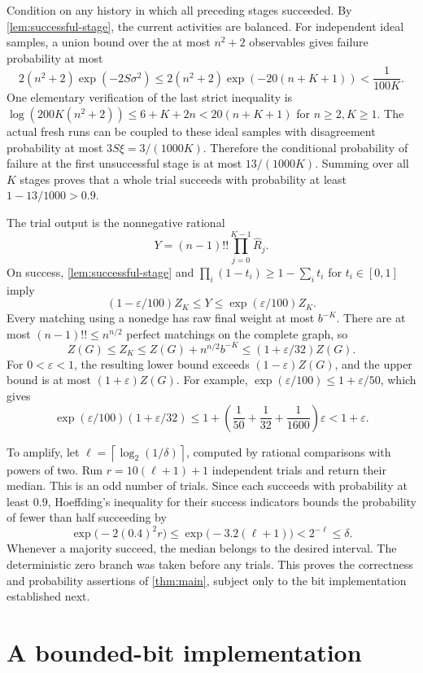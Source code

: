\documentclass[11pt]{article}
\theoremstyle{definition}
\theoremstyle{remark}
\newcommand{\eps}{\varepsilon}
\newcommand{\ceil}[1]{\left\lceil#1\right\rceil}
\numberwithin{equation}{section}
\begin{document}
Condition on any history in which all preceding stages succeeded.
By \cref{lem:successful-stage}, the current activities are balanced.
For independent ideal samples, a union bound over the at most
$n^2+2$ observables gives failure probability at most
\[
 2(n^2+2)\exp(-2S\sigma^2)
 \le2(n^2+2)\exp(-20(n+K+1))<\frac1{100K}.
\]
One elementary verification of the last strict inequality is
$\log(200K(n^2+2))\le6+K+2n<20(n+K+1)$ for $n\ge2,K\ge1$.
The actual fresh runs can be coupled to these ideal samples with
disagreement probability at most $3S\xi=3/(1000K)$.
Therefore the conditional probability of failure at the first
unsuccessful stage is at most $13/(1000K)$. Summing over all $K$
stages proves that a whole trial succeeds with probability at least
$1-13/1000>0.9$.

The trial output is the nonnegative rational
\begin{equation}\label{eq:trial-output}
 Y=(n-1)!!\prod_{j=0}^{K-1}\widehat R_j.
\end{equation}
On success, \cref{lem:successful-stage} and
$\prod_i(1-t_i)\ge1-\sum_i t_i$ for $t_i\in[0,1]$ imply
\[
 (1-\eps/100)Z_K\le Y\le\exp(\eps/100)Z_K.
\]
Every matching using a nonedge has raw final weight at most $b^{-K}$.
There are at most $(n-1)!!\le n^{n/2}$ perfect matchings on the
complete graph, so
\begin{equation}\label{eq:padding-bias}
 Z(G)\le Z_K\le Z(G)+n^{n/2}b^{-K}
             \le(1+\eps/32)Z(G).
\end{equation}
For $0<\eps<1$, the resulting lower bound exceeds
$(1-\eps)Z(G)$, and the upper bound is at most $(1+\eps)Z(G)$.
For example, $\exp(\eps/100)\le1+\eps/50$, which gives
\[
 \exp(\eps/100)(1+\eps/32)
 \le1+\left(\frac1{50}+\frac1{32}+\frac1{1600}\right)\eps
 <1+\eps.
\]

To amplify, let $\ell=\ceil{\log_2(1/\delta)}$, computed by rational
comparisons with powers of two. Run
$r=10(\ell+1)+1$ independent trials and return their median.
This is an odd number of trials. Since each succeeds with probability
at least $0.9$, Hoeffding's inequality for their success indicators
bounds the probability of fewer than half succeeding by
\[
 \exp\bigl(-2(0.4)^2r\bigr)
 \le\exp\bigl(-3.2(\ell+1)\bigr)
 <2^{-\ell}\le\delta.
\]
Whenever a majority succeed, the median belongs to the desired
interval. The deterministic zero branch was taken before any trials.
This proves the correctness and probability assertions of
\cref{thm:main}, subject only to the bit implementation established
next.
\section{A bounded-bit implementation}
\label{sec:complexity}
\end{document}
